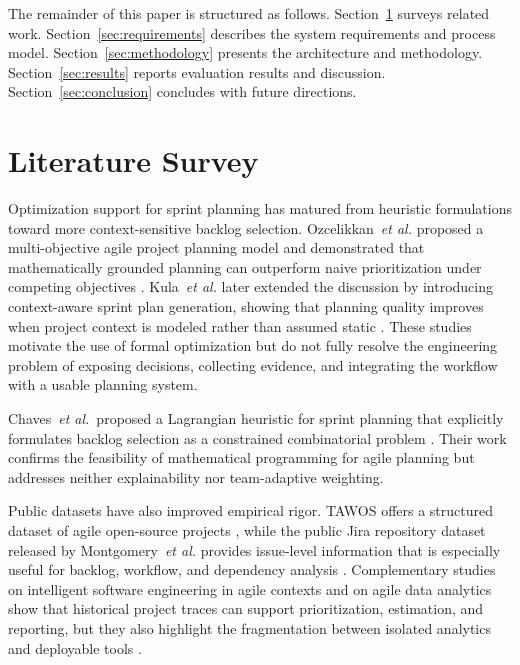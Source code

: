 \documentclass[conference]{IEEEtran}
\begin{document}
The remainder of this paper is structured as follows.
Section~\ref{sec:related} surveys related work.
Section~\ref{sec:requirements} describes the system requirements and process model.
Section~\ref{sec:methodology} presents the architecture and methodology.
Section~\ref{sec:results} reports evaluation results and discussion.
Section~\ref{sec:conclusion} concludes with future directions.

\section{Literature Survey}
\label{sec:related}

Optimization support for sprint planning has matured from heuristic formulations
toward more context-sensitive backlog selection.
Ozcelikkan~\emph{et al.} proposed a multi-objective agile project planning model
and demonstrated that mathematically grounded planning can outperform naive
prioritization under competing objectives \cite{agile-mo}.
Kula~\emph{et al.} later extended the discussion by introducing context-aware
sprint plan generation, showing that planning quality improves when project context
is modeled rather than assumed static \cite{ase2024}.
These studies motivate the use of formal optimization but do not fully resolve the
engineering problem of exposing decisions, collecting evidence, and integrating the
workflow with a usable planning system.

Chaves~\emph{et al.}\ proposed a Lagrangian heuristic for sprint planning that
explicitly formulates backlog selection as a constrained combinatorial problem
\cite{lagrangian-sprint}.
Their work confirms the feasibility of mathematical programming for agile planning
but addresses neither explainability nor team-adaptive weighting.

Public datasets have also improved empirical rigor.
TAWOS offers a structured dataset of agile open-source projects \cite{tawos},
while the public Jira repository dataset released by Montgomery~\emph{et al.}
provides issue-level information that is especially useful for backlog, workflow,
and dependency analysis \cite{jira-dataset}.
Complementary studies on intelligent software engineering in agile contexts and on
agile data analytics show that historical project traces can support prioritization,
estimation, and reporting, but they also highlight the fragmentation between
isolated analytics and deployable tools \cite{intelligent-agile, bigdata-agile}.
\end{document}
